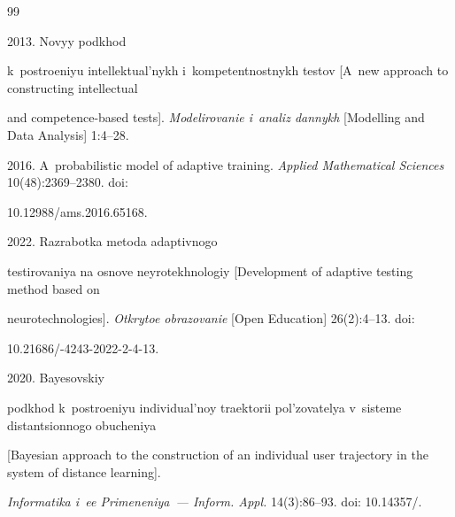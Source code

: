 {\small\frenchspacing


{ %




\begin{thebibliography}{99}





\vspace*{-3pt}







 2013. Novyy podkhod 


k~postroeniyu intellektual'nykh i~kompetentnostnykh testov [A~new approach to constructing intellectual 


and competence-based tests]. \textit{Modelirovanie i~analiz dannykh} [Modelling and Data Analysis] 1:4--28.






2016. A~probabilistic model of adaptive training. \textit{Applied Mathematical Sciences} 10(48):2369--2380. doi: 


10.12988\!/\!ams.2016.65168.




 2022. Razrabotka metoda adaptivnogo 


testirovaniya na osnove neyrotekhnologiy [Development of adaptive testing method based on 


neurotechnologies]. \textit{Otkrytoe obrazovanie} [Open Education] 26(2):4--13. doi:  


10.21686\!/-4243-2022-2-4-13.




 2020. Bayesovskiy 


pod\-khod k~postroeniyu individual'noy traektorii pol'zovatelya v~sis\-te\-me distantsionnogo obucheniya 


[Bayesian approach to the construction of an individual user trajectory in the system of distance learning]. 


\textit{Informatika i~ee Primeneniya~--- Inform. Appl.} 14(3):86--93. doi: 10.14357\!/.



\end{thebibliography}}}

